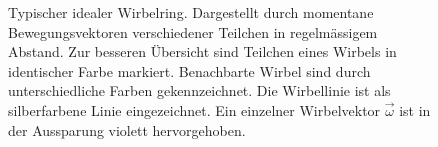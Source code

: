 \begin{figure}
\centering
{}
\caption{Typischer idealer Wirbelring.
Dargestellt durch momentane Bewegungsvektoren verschiedener Teilchen in regelmässigem Abstand.
Zur besseren Übersicht sind Teilchen eines Wirbels in identischer Farbe markiert.
Benachbarte Wirbel sind durch unterschiedliche Farben gekennzeichnet.
Die Wirbellinie ist als silberfarbene Linie eingezeichnet.
Ein einzelner Wirbelvektor \(\vec{\omega}\) ist in der Aussparung violett hervorgehoben.\label{Wirbelringe:fig:generell}}
\end{figure}